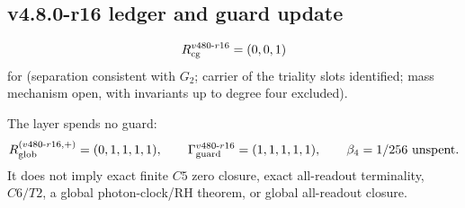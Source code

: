 \subsection*{v4.8.0-r16 ledger and guard update}
\label{subsec:v480-r16-ledger-guard}

\[
R_{\rm cg}^{v480\text{-}r16}=(0,0,1)
\]
for (separation consistent with \(G_2\); carrier of the triality slots identified; mass mechanism open, with
invariants up to degree four excluded).

The layer spends no guard:
\[
R_{\rm glob}^{(v480\text{-}r16,+)}=(0,1,1,1,1),
\qquad
\Gamma_{\rm guard}^{v480\text{-}r16}=(1,1,1,1,1),
\qquad
\beta_4=1/256\ \text{unspent}.
\]
It does not imply exact finite \(C5\) zero closure, exact all-readout terminality,
\(C6/T2\), a global photon-clock/RH theorem, or global all-readout closure.
